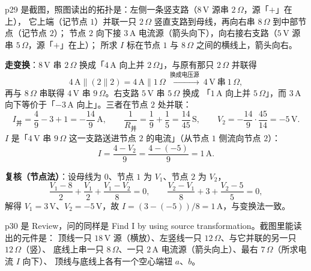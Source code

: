 \documentclass[11pt]{ctexart}
\begin{document}

p29 是截图，照图读出的拓扑是：左侧一条竖支路（$8\,\mathrm{V}$ 源串 $2\,\Omega$，源「$+$」在上），
它上端（记节点 $1$）并联一只 $2\,\Omega$ 竖直支路到母线，再向右串 $8\,\Omega$ 到中部节点（记节点 $2$）；
节点 $2$ 向下接 $3\,\mathrm{A}$ 电流源（箭头向下），向右接右支路（$5\,\mathrm{V}$ 源串 $5\,\Omega$，源「$+$」在上）；
所求 $I$ 标在节点 $1$ 与 $8\,\Omega$ 之间的横线上，箭头向右。

\textbf{走变换}：$8\,\mathrm{V}$ 串 $2\,\Omega$ 换成「$4\,\mathrm{A}$ 向上并 $2\,\Omega$」，与原有那只 $2\,\Omega$ 并联得
\[ 4\,\mathrm{A}\parallel(2\parallel2)=4\,\mathrm{A}\parallel1\,\Omega
 \ \xrightarrow{\text{换成电压源}}\ 4\,\mathrm{V}\ \text{串}\ 1\,\Omega, \]
再与 $8\,\Omega$ 串联得 $4\,\mathrm{V}$ 串 $9\,\Omega$。右支路 $5\,\mathrm{V}$ 串 $5\,\Omega$ 换成
「$1\,\mathrm{A}$ 向上并 $5\,\Omega$」，而 $3\,\mathrm{A}$ 向下等价于「$-3\,\mathrm{A}$ 向上」。三者在节点 $2$ 处并联：
\[ I_{\text{并}}=\frac{4}{9}-3+1=-\frac{14}{9}\,\mathrm{A},\qquad
 \frac{1}{R_{\text{并}}}=\frac{1}{9}+\frac{1}{5}=\frac{14}{45}\,\mathrm{S},\qquad
 V_2=-\frac{14}{9}\cdot\frac{45}{14}=-5\,\mathrm{V} . \]
$I$ 是「$4\,\mathrm{V}$ 串 $9\,\Omega$ 这一支路送进节点 $2$ 的电流」（从节点 $1$ 侧流向节点 $2$）：
\[ I=\frac{4-V_2}{9}=\frac{4-(-5)}{9}=\boxed{1\,\mathrm{A}} . \]

\textbf{复核（节点法）}：设母线为 $0$、节点 $1$ 为 $V_1$、节点 $2$ 为 $V_2$，
\[ \frac{V_1-8}{2}+\frac{V_1}{2}+\frac{V_1-V_2}{8}=0,\qquad
 \frac{V_2-V_1}{8}+3+\frac{V_2-5}{5}=0, \]
解得 $V_1=3\,\mathrm{V}$、$V_2=-5\,\mathrm{V}$，故 $I=(3-(-5))/8=1\,\mathrm{A}$，与变换法一致。




p30 是 Review，问的同样是 Find I by using source transformation。截图里能读出的元件是：
顶线一只 $18\,\mathrm{V}$ 源（横放）、左竖线一只 $12\,\Omega$、与它并联的另一只 $12\,\Omega$（竖）、
底线上串一只 $8\,\Omega$、一只 $2\,\mathrm{A}$ 电流源（箭头向上）、最右 $7\,\Omega$（所求电流 $I$ 向下）、
顶线与底线上各有一个空心端钮 $a$、$b$。
\end{document}
